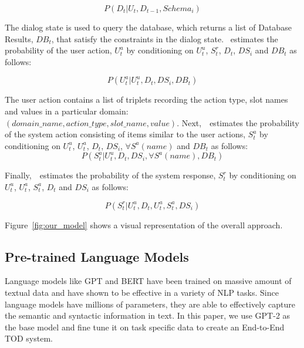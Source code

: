 \begin{equation}
    P(D_t | U_t, D_{t-1}, Schema_i)
    \label{eq:dialog_state}
\end{equation}

The dialog state is used to query the database, which returns a list of Database Results, $DB_t$, that satisfy the constraints in the dialog state.
\oursys~estimates the probability of the user action, $U^a_t$ by conditioning on $U^u_t$, $S^r_t$, $D_t$, $DS_i$ and $DB_t$ as follows:

\begin{equation}
    P(U_t^a | U^u_t, D_{t}, DS_i, DB_t)
    \label{eq:user_action}
\end{equation}

The user action contains a list of triplets recording the action type, slot names and values in a particular domain: $(domain\_name, action\_type, slot\_name, value)$.
Next,~\oursys~estimates the probability of the system action consisting of items similar to the user actions, $S^a_t$ by conditioning on $U^u_t$, $U^a_t$, $D_t$, $DS_i$, $\forall S^a(name)$  and $DB_t$ as follows:
\begin{equation}
    P(S_t^a | U^u_t, D_{t}, DS_i,\forall S^a(name), DB_t)
    \label{eq:system_action}
\end{equation}

Finally,~\oursys~estimates the probability of the system response, $S^r_t$ by conditioning on $U^u_t$, $U^a_t$, $S^a_t$, $D_t$ and $DS_i$ as follows:

\begin{equation}
    P(S_t^r | U^u_t, D_t, U^a_t, S^a_t, DS_i)
    \label{eq:system_response}
\end{equation}

Figure~\ref{fig:our_model} shows a visual representation of the overall approach.

\subsection{Pre-trained Language Models}

Language models like GPT and BERT have been trained on massive amount of textual data and have shown to be effective in a variety of NLP tasks.
Since language models have millions of parameters, they are able to effectively capture the semantic and syntactic information in text.
In this paper, we use GPT-2 as the base model and fine tune it on task specific data to create an End-to-End TOD system.

